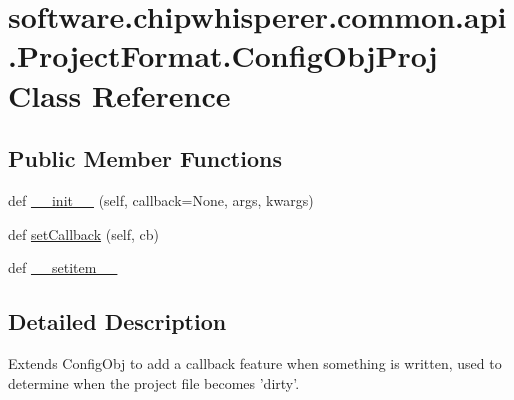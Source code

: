 \hypertarget{classsoftware_1_1chipwhisperer_1_1common_1_1api_1_1ProjectFormat_1_1ConfigObjProj}{}\section{software.\+chipwhisperer.\+common.\+api.\+Project\+Format.\+Config\+Obj\+Proj Class Reference}
\label{classsoftware_1_1chipwhisperer_1_1common_1_1api_1_1ProjectFormat_1_1ConfigObjProj}
\subsection*{Public Member Functions}
\begin{DoxyCompactItemize}
\item 
def \hyperlink{classsoftware_1_1chipwhisperer_1_1common_1_1api_1_1ProjectFormat_1_1ConfigObjProj_a8ba34afc7ba245d3eafa76a48986eb27}{\+\_\+\+\_\+init\+\_\+\+\_\+} (self, callback=None, args, kwargs)
\item 
def \hyperlink{classsoftware_1_1chipwhisperer_1_1common_1_1api_1_1ProjectFormat_1_1ConfigObjProj_a974fd9846d48927eaf288f7184afa3b4}{set\+Callback} (self, cb)
\item 
def \hyperlink{classsoftware_1_1chipwhisperer_1_1common_1_1api_1_1ProjectFormat_1_1ConfigObjProj_affc94346f01415d4bbc266f22ef8990a}{\+\_\+\+\_\+setitem\+\_\+\+\_\+}
\end{DoxyCompactItemize}


\subsection{Detailed Description}
\begin{DoxyVerb}Extends ConfigObj to add a callback feature when something is written, used
to determine when the project file becomes 'dirty'.
\end{DoxyVerb}
 

